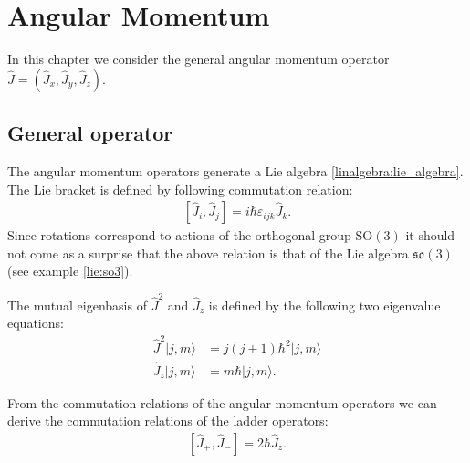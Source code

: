 \chapter{Angular Momentum}

    In this chapter we consider the general angular momentum operator $\hat{J} = \left(\hat{J}_x, \hat{J}_y, \hat{J}_z\right)$.

\section{General operator}

    \begin{property}
       The angular momentum operators generate a Lie algebra \ref{linalgebra:lie_algebra}. The Lie bracket is defined by following commutation relation:
       \begin{gather}
           \label{QM:angular_momentum:commutation}
           \left[\hat{J}_i, \hat{J}_j\right] = i\hbar\varepsilon_{ijk}\hat{J}_k.
       \end{gather}
       Since rotations correspond to actions of the orthogonal group $\text{SO}(3)$ it should not come as a surprise that the above relation is that of the Lie algebra $\mathfrak{so}(3)$ (see example \ref{lie:so3}).
    \end{property}

    \begin{property}
       The mutual eigenbasis of $\hat{J}^2$ and $\hat{J}_z$ is defined by the following two eigenvalue equations:
       \begin{align}
           \label{QM:angular_momentum:j}
           \hat{J}^2|j, m\rangle &= j(j+1)\hbar^2|j, m\rangle\\
           \label{QM:angular_momentum:m}
           \hat{J}_z|j, m\rangle &= m\hbar|j, m\rangle.
        \end{align}
    \end{property}

    \begin{result}
        From the commutation relations of the angular momentum operators we can derive the commutation relations of the ladder operators:
        \begin{gather}
            \left[\hat{J}_+, \hat{J}_-\right] = 2\hbar\hat{J}_z.
        \end{gather}
    \end{result}

